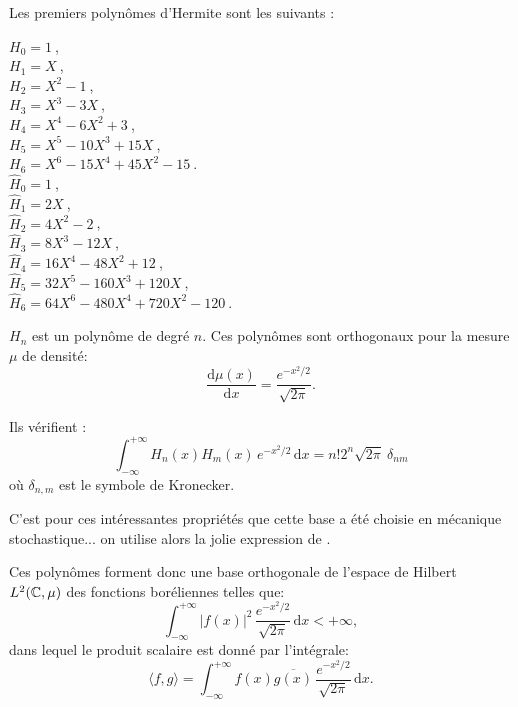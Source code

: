 \medskip
{}
Les premiers polynômes d'Hermite sont les suivants :
\begin{multicols}{2}
\noindent%
   $H_0=1~$,\\
   $H_1=X~$,\\
    $H_2=X^2-1~$,\\
    $H_3=X^3-3X~$,\\
    $H_4=X^4-6X^2+3~$,\\
    $H_5=X^5-10X^3+15X~$,\\
    $H_6=X^6-15X^4+45X^2-15~$.\\

\noindent%
    $\widehat{H}_0=1~$,\\
    $\widehat{H}_1=2X~$,\\
    $\widehat{H}_2=4X^2-2~$,\\
    $\widehat{H}_3=8X^3-12X~$,\\
    $\widehat{H}_4=16X^4-48X^2+12~$,\\
    $\widehat{H}_5=32X^5-160X^3+120X~$,\\
    $\widehat{H}_6=64X^6-480X^4+720X^2-120~$.
\end{multicols}

\medskip
$H_n$ est un polynôme de degré $n$. 
Ces polynômes sont orthogonaux pour la mesure $\mu$ de densité:
\begin{equation}
    \frac{\mathrm{d}\mu(x)}{\mathrm{d}x} = \frac{e^{-x^2/2}}{\sqrt{2\pi}}.
\end{equation}

Ils vérifient :
\begin{equation}
    \int_{-\infty}^{+\infty} H_n(x)H_m(x)\,e^{-x^2/2}\,\mathrm{d}x=n!2^n\sqrt{2\pi}~\delta_{nm}
\end{equation}
où $\delta_{n,m}$ est le symbole de Kronecker.

C'est pour ces intéressantes propriétés que cette base a été choisie en mécanique stochastique... 
on utilise alors la jolie expression de .

\medskip
Ces polynômes forment donc une base orthogonale de l'espace de Hilbert 
$L^2(\mathbb C,\mu)$ des fonctions boréliennes telles que:
\begin{equation}
    \int_{-\infty}^{+\infty}|f(x)|^2\,\frac{e^{-x^2/2}}{\sqrt{2\pi}}\,\mathrm{d}x< +\infty,
\end{equation}
dans lequel le produit scalaire est donné par l'intégrale:
\begin{equation}
    \langle f,g\rangle=\int_{-\infty}^{+\infty} f(x)\overline{g(x)}\,\frac{e^{-x^2/2}}{\sqrt{2\pi}}\,\mathrm{d}x.
\end{equation}

